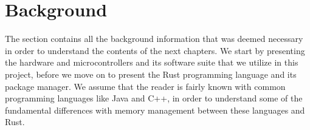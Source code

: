 
\chapter{Background}
\label{chap:background}

The section contains all the background information that was deemed necessary in order to understand the contents of the next chapters.
We start by presenting the hardware and microcontrollers and its software suite that we utilize in this project, before we move on to present the Rust programming language and its package manager.
We assume that the reader is fairly known with common programming languages like Java and C++, in order to understand some of the fundamental differences with memory management between these languages and Rust.










